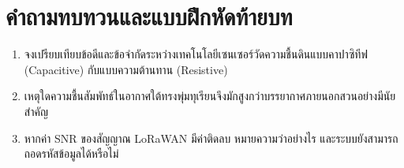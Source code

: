 \section{คำถามทบทวนและแบบฝึกหัดท้ายบท}
\begin{enumerate}
    \item จงเปรียบเทียบข้อดีและข้อจำกัดระหว่างเทคโนโลยีเซนเซอร์วัดความชื้นดินแบบคาปาซิทีฟ (Capacitive) กับแบบความต้านทาน (Resistive)
    \item เหตุใดความชื้นสัมพัทธ์ในอากาศใต้ทรงพุ่มทุเรียนจึงมักสูงกว่าบรรยากาศภายนอกสวนอย่างมีนัยสำคัญ
    \item หากค่า SNR ของสัญญาณ LoRaWAN มีค่าติดลบ หมายความว่าอย่างไร และระบบยังสามารถถอดรหัสข้อมูลได้หรือไม่
\end{enumerate}
